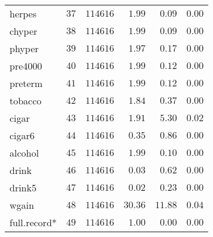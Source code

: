\begin{table}[!tbp]
\begin{center}
\begin{tabular}{lrrrrr}
herpes&$37$&$114616$&$   1.99$&$  0.09$&$0.00$\tabularnewline
chyper&$38$&$114616$&$   1.99$&$  0.09$&$0.00$\tabularnewline
phyper&$39$&$114616$&$   1.97$&$  0.17$&$0.00$\tabularnewline
pre4000&$40$&$114616$&$   1.99$&$  0.12$&$0.00$\tabularnewline
preterm&$41$&$114616$&$   1.99$&$  0.12$&$0.00$\tabularnewline
tobacco&$42$&$114616$&$   1.84$&$  0.37$&$0.00$\tabularnewline
cigar&$43$&$114616$&$   1.91$&$  5.30$&$0.02$\tabularnewline
cigar6&$44$&$114616$&$   0.35$&$  0.86$&$0.00$\tabularnewline
alcohol&$45$&$114616$&$   1.99$&$  0.10$&$0.00$\tabularnewline
drink&$46$&$114616$&$   0.03$&$  0.62$&$0.00$\tabularnewline
drink5&$47$&$114616$&$   0.02$&$  0.23$&$0.00$\tabularnewline
wgain&$48$&$114616$&$  30.36$&$ 11.88$&$0.04$\tabularnewline
full.record*&$49$&$114616$&$   1.00$&$  0.00$&$0.00$\tabularnewline
\hline
\end{tabular}
\end{center}
\end{table}

